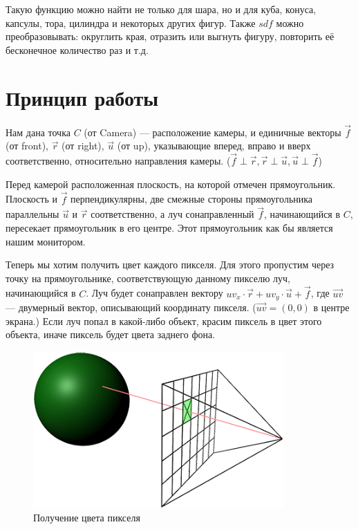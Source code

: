 \documentclass[12pt,a4paper]{article}
\begin{document}
Такую функцию можно найти не только для шара, но и для куба, конуса, капсулы, 
тора, цилиндра и некоторых других фигур. Также $sdf$ можно преобразовывать: 
округлить края, отразить или выгнуть фигуру, повторить её бесконечное
количество раз и т.д.


\section{Принцип работы}
Нам дана точка $C$ (от Camera) --- расположение камеры, и единичные векторы
$\vec{f}$ (от front), $\vec{r}$ (от right), $\vec{u}$ (от up), указывающие
вперед, вправо и вверх соответственно, относительно направления камеры.
($\vec{f} \perp \vec{r}, \vec{r} \perp \vec{u}, \vec{u} \perp \vec{f}$)

Перед камерой расположенная плоскость, на которой отмечен прямоугольник.
Плоскость и $\vec{f}$ перпендикулярны, две смежные стороны прямоугольника
параллельны $\vec{u}$ и $\vec{r}$ соответственно, а луч сонаправленный
$\vec{f}$, начинающийся в $C$, пересекает прямоугольник в его центре. Этот
прямоугольник как бы является нашим монитором.

Теперь мы хотим получить цвет каждого пикселя. Для этого пропустим через точку
на прямоугольнике, соответствующую данному пикселю луч, начинающийся в $C$. Луч
будет сонаправлен вектору $uv_x \cdot \vec{r} + uv_y \cdot \vec{u} + \vec{f}$,
где $\vec{uv}$ --- двумерный вектор, описывающий координату пикселя.
($\vec{uv} = \left(0, 0\right)$ в центре экрана.) Если луч попал в какой-либо
объект, красим пиксель в цвет этого объекта, иначе пиксель будет цвета заднего
фона.

\begin{figure}[H]
    \centering
    \includegraphics[height=6cm]{get_pixel}
    \caption{Получение цвета пикселя}
\end{figure}
\end{document}
